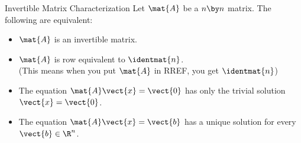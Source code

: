 \documentclass{beamer}
\begin{document}
\begin{frame}
\begin{block}{Invertible Matrix Characterization}
Let $\mat{A}$ be a $n \by n$ matrix. The following are equivalent:
\begin{itemize}
\item<+-> $\mat{A}$ is an invertible matrix.
\item<+-> $\mat{A}$ is row equivalent to $\identmat{n}$.\\ (This means when you put $\mat{A}$ in RREF, you get $\identmat{n}$)
\item<+-> The equation $\mat{A}\vect{x}=\vect{0}$ has only the trivial solution $\vect{x}=\vect{0}$.
\item<+-> The equation $\mat{A}\vect{x}=\vect{b}$ has a unique solution for every $\vect{b}\in\R^n$.
\end{itemize}
\end{block}
\end{frame}
\end{document}
